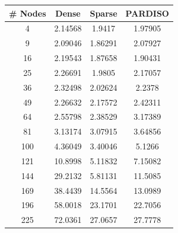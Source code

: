 \documentclass[letterpaper, 10 pt, conference]{ieeeconf}  %
\begin{document}
\begin{figure}
\begin{minipage}[b]{.45\linewidth}
                 \label{fig:tablecloth}
        \end{minipage}
        \begin{minipage}[b]{.45\linewidth}
                \begin{center}
                        \begin{tabular}{|c|c|c|c|}
                        \hline
                        \textbf{\# Nodes} & \textbf{Dense} & \textbf{Sparse} & \textbf{PARDISO} \\ \hline
                        4                 & 2.14568        & 1.9417          & 1.97905          \\ \hline
                        9                 & 2.09046        & 1.86291         & 2.07927          \\ \hline
                        16                & 2.19543        & 1.87658         & 1.90431          \\ \hline
                        25                & 2.26691        & 1.9805          & 2.17057          \\ \hline
                        36                & 2.32498        & 2.02624         & 2.2378           \\ \hline
                        49                & 2.26632        & 2.17572         & 2.42311          \\ \hline
                        64                & 2.55798        & 2.38529         & 3.17389          \\ \hline
                        81                & 3.13174        & 3.07915         & 3.64856          \\ \hline
                        100               & 4.36049        & 3.40046         & 5.1266           \\ \hline
                        121               & 10.8998        & 5.11832         & 7.15082          \\ \hline
                        144               & 29.2132        & 5.81131         & 11.5085          \\ \hline
                        169               & 38.4439        & 14.5564         & 13.0989          \\ \hline
                        196               & 58.0018        & 23.1701         & 22.7056          \\ \hline
                        225               & 72.0361        & 27.0657         & 27.7778          \\ \hline

\end{tabular}
\end{center}
\end{minipage}
\end{figure}
\end{document}
